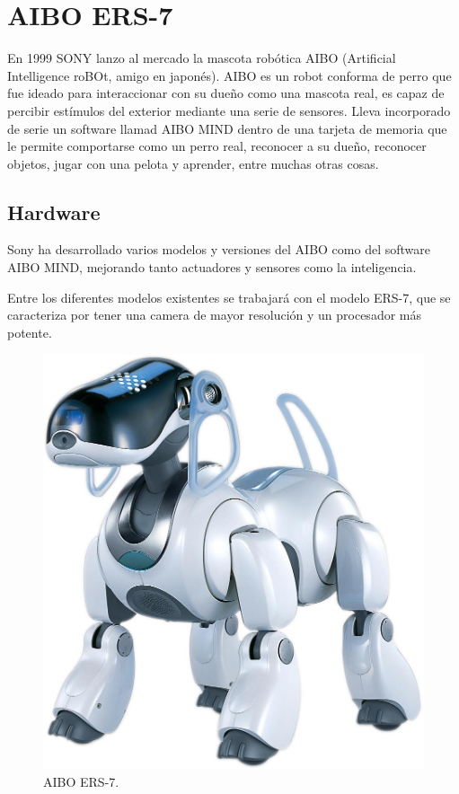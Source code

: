 \documentclass[12pt,a4paper,final,twoside]{book}
\begin{document}
\newpage
\clearpage

\section{AIBO ERS-7}\label{secaibo}
En 1999 SONY lanzo al mercado la mascota robótica AIBO (Artificial Intelligence roBOt, amigo en japonés). AIBO es un robot conforma de perro 
que fue ideado para interaccionar con su dueño como una mascota real, es capaz de percibir estímulos del exterior mediante una serie de sensores. Lleva incorporado de serie un software llamad AIBO MIND dentro de una tarjeta de memoria que le permite comportarse como un perro real, reconocer a su dueño, reconocer objetos, jugar con una pelota y aprender, entre muchas otras cosas.


\subsection{Hardware}
Sony ha desarrollado varios modelos y versiones del AIBO como del software AIBO MIND, mejorando tanto actuadores y sensores como la inteligencia.

Entre los diferentes modelos existentes se trabajará con el modelo ERS-7, que se caracteriza por tener una camera de mayor resolución y un procesador más potente.

\begin{figure}[h!]
	\centering
    \includegraphics[scale=0.1]	{images/ers7lrg}
	 \caption{AIBO ERS-7.}
  \label{fig:ers7}
\end{figure}	
\end{document}
